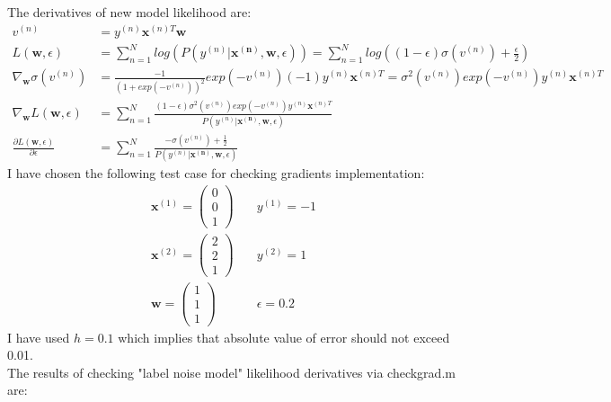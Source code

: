 \documentclass{article}
\newcommand{\vect}[1]{\boldsymbol{#1}} %
\begin{document}
\begin{enumerate}[label=(\alph*)]
						The derivatives of new model likelihood are:
						\begin{align}
							v^{(n)} &= y^{(n)}\vect{x}^{(n)T}\vect{w}
							\\
							L(\vect{w}, \epsilon) &= \sum_{n=1}^{N}log(P(y^{(n)}|\vect{x^{(n)}}, \vect{w}, \epsilon)) = 
							\sum_{n=1}^{N}log((1-\epsilon)\sigma(v^{(n)}) + \frac{\epsilon}{2}) 
							\\
							\nabla_{\vect{w}}\sigma(v^{(n)}) &= 
							\frac{-1} {(1 + exp(-v^{(n)}))^2} exp(-v^{(n)}) (-1) y^{(n)} \vect{x}^{(n)T} 
							= \sigma^2(v^{(n)}) exp(-v^{(n)}) y^{(n)}\vect{x}^{(n)T}
							\\
							\nabla_{\vect{w}}L(\vect{w}, \epsilon) &= 
							\sum_{n=1}^{N}
								\frac
									{ (1 - \epsilon) \sigma^2(v^{(n)}) exp(-v^{(n)}) y^{(n)} \vect{x}^{(n)T} } 
									{ P(y^{(n)}|\vect{x^{(n)}}, \vect{w}, \epsilon) }				
							\\
							\frac{\partial L(\vect{w}, \epsilon)}{\partial \epsilon} &=
							 \sum_{n=1}^{N} 
								 \frac 
									 {-\sigma(v^{(n)}) + \frac{1}{2}} 
									 {P(y^{(n)}|\vect{x^{(n)}}, \vect{w}, \epsilon)}		
						\end{align}
						I have chosen the following test case for checking gradients implementation:
						\begin{align*}
							\vect{x}^{(1)} = \left(\begin{matrix} 0\\ 0\\ 1 \end{matrix}\right)
							&\quad
							y^{(1)} = -1
							\\
							\vect{x}^{(2)} = \left(\begin{matrix} 2\\ 2\\ 1 \end{matrix}\right)
							&\quad
							y^{(2)}=1 
							\\
							\vect{w} = \left(\begin{matrix} 1\\ 1\\ 1 \end{matrix}\right)
							&\quad
							\epsilon = 0.2
						\end{align*}
						I have used $h =0.1$ which implies that absolute value of error should not exceed 0.01.\\ 
						The results of checking "label noise model" likelihood derivatives via checkgrad.m are:
						\begin{center}

\end{center}
\end{enumerate}
\end{document}
